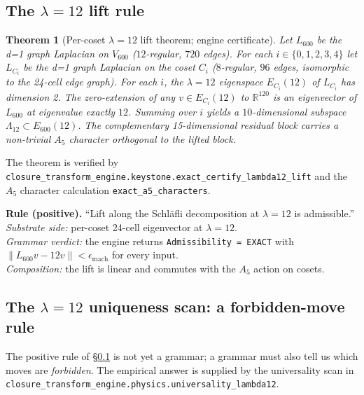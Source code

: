\documentclass[11pt,a4paper]{article}
\newtheorem{theorem}{Theorem}
\newcommand{\Vsix}{V_{600}}
\newcommand{\R}{\mathbb{R}}
\newcommand{\Lambt}{\Lambda_{12}}
\newcommand{\Esix}{E_{600}}
\begin{document}
\subsection{The $\lambda = 12$ lift rule}
\label{sec:grammar:lambda12}

\begin{theorem}[Per-coset $\lambda = 12$ lift theorem; engine
certificate]
\label{thm:lambda12}
Let $L_{600}$ be the d=1 graph Laplacian on $\Vsix$
($12$-regular, $720$ edges). For each $i \in \{0,1,2,3,4\}$ let
$L_{C_i}$ be the d=1 graph Laplacian on the coset $C_i$
($8$-regular, $96$ edges, isomorphic to the 24-cell edge graph).
For each $i$, the $\lambda = 12$ eigenspace $E_{C_i}(12)$ of
$L_{C_i}$ has dimension 2. The zero-extension of any
$v \in E_{C_i}(12)$ to $\R^{120}$ is an eigenvector of $L_{600}$
at eigenvalue exactly $12$. Summing over $i$ yields a
$10$-dimensional subspace $\Lambt \subset \Esix(12)$. The
complementary 15-dimensional residual block carries a non-trivial
$A_5$ character orthogonal to the lifted block.
\end{theorem}

The theorem is verified by
\texttt{closure\_transform\_engine.keystone.exact\_certify\_lambda12\_lift}
and the $A_5$ character calculation
\texttt{exact\_a5\_characters}.

\begin{grammarbox}
\textbf{Rule (positive).} ``Lift along the Schl\"afli decomposition
at $\lambda = 12$ is admissible.''
\\
\emph{Substrate side:} per-coset 24-cell eigenvector at
$\lambda = 12$.
\\
\emph{Grammar verdict:} the engine returns
\texttt{Admissibility = EXACT} with $\|L_{600} v - 12 v\| <
\epsilon_{\mathrm{mach}}$ for every input.
\\
\emph{Composition:} the lift is linear and commutes with the
$A_5$ action on cosets.
\end{grammarbox}

\subsection{The $\lambda = 12$ uniqueness scan: a forbidden-move
rule}
\label{sec:grammar:uniqueness}

The positive rule of \S\ref{sec:grammar:lambda12} is not yet a
grammar; a grammar must also tell us which moves are
\emph{forbidden}. The empirical answer is supplied by the
universality scan in
\texttt{closure\_transform\_engine.physics.universality\_lambda12}.
\end{document}
